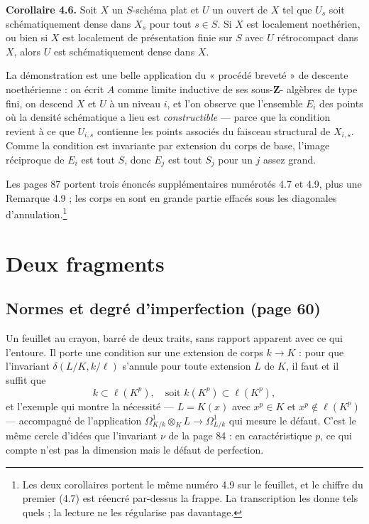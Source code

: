 \documentclass[11pt,a4paper]{article}
\begin{document}
\textbf{Corollaire 4.6.} Soit $X$ un $S$-schéma plat et $U$ un ouvert de $X$ tel
que $U_s$ soit schématiquement dense dans $X_s$ pour tout $s \in S$. Si $X$ est
localement noethérien, ou bien si $X$ est localement de présentation finie sur
$S$ avec $U$ rétrocompact dans $X$, alors $U$ est schématiquement dense dans $X$.

La démonstration est une belle application du « procédé breveté » de descente
noethérienne : on écrit $A$ comme limite inductive de ses sous-$\mathbf{Z}$-
algèbres de type fini, on descend $X$ et $U$ à un niveau $i$, et l'on observe
que l'ensemble $E_i$ des points où la densité schématique a lieu est
\emph{constructible} — parce que la condition revient à ce que $U_{i,s}$ contienne
les points associés du faisceau structural de $X_{i,s}$. Comme la condition est
invariante par extension du corps de base, l'image réciproque de $E_i$ est tout
$S$, donc $E_j$ est tout $S_j$ pour un $j$ assez grand.

Les pages 87 portent trois énoncés supplémentaires numérotés 4.7 et 4.9, plus
une Remarque 4.9 ; les corps en sont en grande partie effacés sous les
diagonales d'annulation.\footnote{Les deux corollaires portent le même numéro
4.9 sur le feuillet, et le chiffre du premier (4.7) est réencré par-dessus la
frappe. La transcription les donne tels quels ; la lecture ne les régularise pas
davantage.}

\section*{Deux fragments}

\subsection*{Normes et degré d'imperfection (page 60)}

Un feuillet au crayon, barré de deux traits, sans rapport apparent avec ce qui
l'entoure. Il porte une condition sur une extension de corps $k \to K$ : pour
que l'invariant $\delta(L/K, k/\ell)$ s'annule pour toute extension $L$ de $K$,
il faut et il suffit que
\[
k \subset \ell(K^p), \quad \text{soit } k(K^p) \subset \ell(K^p),
\]
et l'exemple qui montre la nécessité — $L = K(x)$ avec $x^p \in K$ et
$x^p \notin \ell(K^p)$ — accompagné de l'application
$\Omega^1_{K/k} \otimes_K L \to \Omega^1_{L/k}$ qui mesure le défaut. C'est le
même cercle d'idées que l'invariant $\nu$ de la page 84 : en caractéristique
$p$, ce qui compte n'est pas la dimension mais le défaut de perfection.
\end{document}
